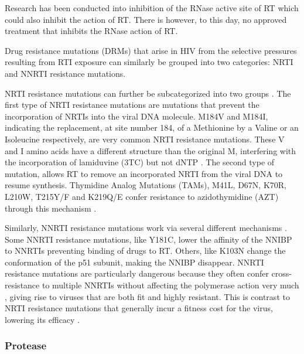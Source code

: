 \documentclass[
  11pt,
  twoside,
  BCOR=10mm,
  listof=totoc]{scrbook}
\begin{document}
Research has been conducted into inhibition of the RNase active site of RT \autocite{hangActivityIsolatedHIV2004,klumppRecentProgressDesign2006} which could also inhibit the action of RT. There is however, to this day, no approved treatment that inhibits the RNase action of RT.

Drug resistance mutations (DRMs) that arise in HIV from the selective pressures resulting from RTI exposure can similarly be grouped into two categories: NRTI and NNRTI resistance mutations.

NRTI resistance mutations can further be subcategorized into two groups \autocite{menendez-ariasMechanismsResistanceNucleoside2008,sluis-cremerMolecularMechanismsHIV12000}. The first type of NRTI resistance mutations are mutations that prevent the incorporation of NRTIs into the viral DNA molecule. M184V and M184I, indicating the replacement, at site number 184, of a Methionine by a Valine or an Isoleucine respectively, are very common NRTI resistance mutations. These V and I amino acids have a different structure than the original M, interfering with the incorporation of lamiduvine (3TC) but not dNTP \autocite{sarafianosLamivudine3TCResistance1999}. The second type of mutation, allows RT to remove an incorporated NRTI from the viral DNA to resume synthesis. Thymidine Analog Mutations (TAMs), M41L, D67N, K70R, L210W, T215Y/F and K219Q/E confer resistance to azidothymidine (AZT) through this mechanism \autocite{meyerMechanismAZTResistance1999,boyerSelectiveExcisionAZTMP2001}.

Similarly, NNRTI resistance mutations work via several different mechanisms \autocite{deeksNonnucleosideReverseTranscriptase2001,renStructuralBasisDrug2008}. Some NNRTI resistance mutations, like Y181C, lower the affinity of the NNIBP to NNRTIs preventing binding of drugs to RT. Others, like K103N change the conformation of the p51 subunit, making the NNIBP disappear. NNRTI resistance mutations are particularly dangerous because they often confer cross-resistance to multiple NNRTIs without affecting the polymerase action very much \autocite{ammaranondMechanismHIVAntiretroviral2012}, giving rise to viruses that are both fit and highly resistant. This is contrast to NRTI resistance mutations that generally incur a fitness cost for the virus, lowering its efficacy \autocite{lloydHighCostFidelity2014}.

\hypertarget{protease}{%
\subsubsection{Protease}\label{protease}}
\end{document}
